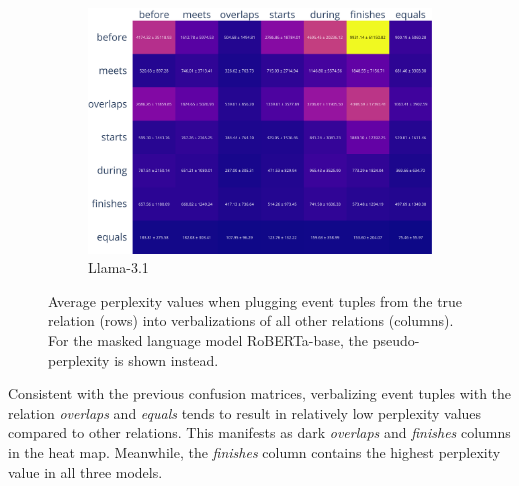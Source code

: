 \documentclass[11pt]{article}
\begin{document}
\begin{figure}
    \vspace{1em}

    \begin{subfigure}[b]{0.95\textwidth}
      \centering
      \includegraphics[width=0.95\columnwidth, height=0.3\textheight, keepaspectratio, valign=c]{../plots/meta-llama-3-1-8b_confusion_matrix_values.pdf}
      \caption{Llama-3.1}
    \end{subfigure}
  \caption{Average perplexity values when plugging event tuples from the true relation (rows) into verbalizations of all other relations (columns). For the masked language model RoBERTa-base, the pseudo-perplexity is shown instead.}
  \label{fig:confusion_matrix_values}
\end{figure}

Consistent with the previous confusion matrices, verbalizing event tuples with the relation \textit{overlaps} and \textit{equals} tends to result in relatively low perplexity values compared to other relations. This manifests as dark \textit{overlaps} and \textit{finishes} columns in the heat map. Meanwhile, the \textit{finishes} column contains the highest perplexity value in all three models. 
\end{document}

